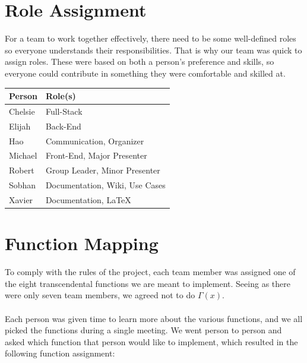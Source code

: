 \documentclass[11pt,onside]{report}
\begin{document}
\section{Role Assignment}
\begin{description}
For a team to work together effectively, there need to be some well-defined roles so everyone understands their responsibilities. That is why our team was quick to assign roles. These were based on both a person's preference and skills, so everyone could contribute in something they were comfortable and skilled at.
\end{description}
\begin{center}
\begin{tabular}{|l|l|}
    \hline
    \bf{Person} & \bf{Role(s)}  \\
    \hline
    Chelsie & Full-Stack \\
    \hline
    Elijah & Back-End \\
    \hline
    Hao & Communication, Organizer \\
    \hline
    Michael & Front-End, Major Presenter \\
    \hline
    Robert & Group Leader, Minor Presenter \\
    \hline
    Sobhan & Documentation, Wiki, Use Cases \\
    \hline
    Xavier & Documentation, \LaTeX{} \\
    \hline
\end{tabular}
\end{center}

\section{Function Mapping}
\begin{description}
To comply with the rules of the project, each team member was assigned one of the eight transcendental functions we are meant to implement. Seeing as there were only seven team members, we agreed not to do $\Gamma{}(x)$. \\ \\

Each person was given time to learn more about the various functions, and we all picked the functions during a single meeting. We went person to person and asked which function that person would like to implement, which resulted in the following function assignment:
\end{description}
\end{document}
